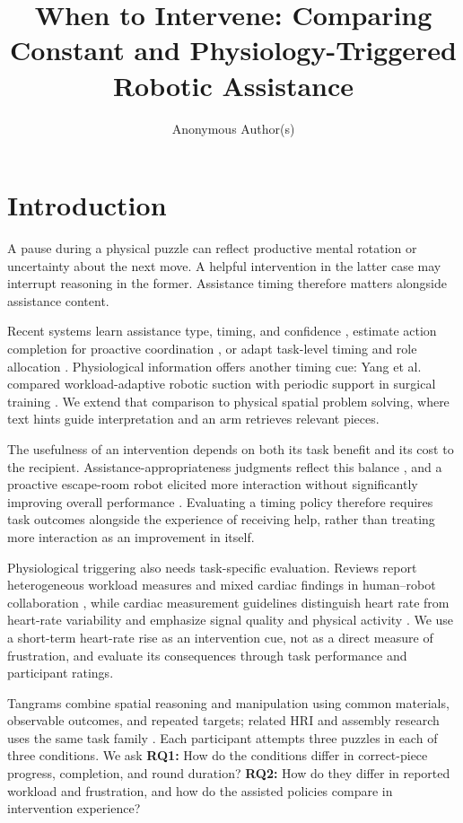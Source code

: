 \documentclass[sigconf,anonymous]{aamas}
\title{When to Intervene: Comparing Constant and Physiology-Triggered Robotic Assistance}
\author{Anonymous Author(s)}
\begin{document}
\maketitle


\section{Introduction}

A pause during a physical puzzle can reflect productive mental rotation or uncertainty about the next move. A helpful intervention in the latter case may interrupt reasoning in the former. Assistance timing therefore matters alongside assistance content.

Recent systems learn assistance type, timing, and confidence \cite{andriella2025}, estimate action completion for proactive coordination \cite{delazzari2025}, or adapt task-level timing and role allocation \cite{karbouj2026}. Physiological information offers another timing cue: Yang et al. compared workload-adaptive robotic suction with periodic support in surgical training \cite{yang2024}. We extend that comparison to physical spatial problem solving, where text hints guide interpretation and an arm retrieves relevant pieces.

The usefulness of an intervention depends on both its task benefit and its cost to the recipient. Assistance-appropriateness judgments reflect this balance \cite{ramnauth2026}, and a proactive escape-room robot elicited more interaction without significantly improving overall performance \cite{vitry2026}. Evaluating a timing policy therefore requires task outcomes alongside the experience of receiving help, rather than treating more interaction as an improvement in itself.

Physiological triggering also needs task-specific evaluation. Reviews report heterogeneous workload measures and mixed cardiac findings in human--robot collaboration \cite{pereira2025}, while cardiac measurement guidelines distinguish heart rate from heart-rate variability and emphasize signal quality and physical activity \cite{quigley2024}. We use a short-term heart-rate rise as an intervention cue, not as a direct measure of frustration, and evaluate its consequences through task performance and participant ratings.

Tangrams combine spatial reasoning and manipulation using common materials, observable outcomes, and repeated targets; related HRI and assembly research uses the same task family \cite{tabatabaei2025,melo2026}. Each participant attempts three puzzles in each of three conditions. We ask \textbf{RQ1:} How do the conditions differ in correct-piece progress, completion, and round duration? \textbf{RQ2:} How do they differ in reported workload and frustration, and how do the assisted policies compare in intervention experience?
\end{document}

